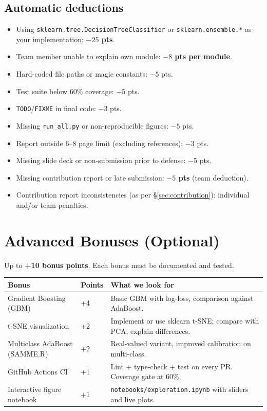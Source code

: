 \documentclass[11pt,a4paper]{article}
\newcommand{\warn}[1]{\textcolor{accent2}{\textbf{#1}}}
\begin{document}
\subsection{Automatic deductions}
\begin{itemize}[topsep=2pt,itemsep=1pt]
  \item Using \texttt{sklearn.tree.DecisionTreeClassifier} or \texttt{sklearn.ensemble.*} as your implementation: \warn{$-25$ pts}.
  \item Team member unable to explain own module: \warn{$-8$ pts per module}.
  \item Hard-coded file paths or magic constants: $-5$ pts.
  \item Test suite below 60\% coverage: $-5$ pts.
  \item \texttt{TODO}/\texttt{FIXME} in final code: $-3$ pts.
  \item Missing \texttt{run\_all.py} or non-reproducible figures: $-5$ pts.
  \item Report outside 6--8 page limit (excluding references): $-3$ pts.
  \item Missing slide deck or non-submission prior to defense: $-5$ pts.
  \item Missing contribution report or late submission: \warn{$-5$ pts} (team deduction).
  \item Contribution report inconsistencies (as per \S\ref{sec:contribution}): individual and/or team penalties.
\end{itemize}
\section{Advanced Bonuses (Optional)}\label{sec:bonuses}
Up to \textbf{+10 bonus points}. Each bonus must be documented and tested.
\begin{center}\small
\begin{tabular}{>{\raggedright\arraybackslash}p{5.2cm} >{\centering\arraybackslash}p{1.3cm} >{\raggedright\arraybackslash}p{8.8cm}}
\toprule
\textbf{Bonus} & \textbf{Points} & \textbf{What we look for}\\
\midrule
Gradient Boosting (GBM) & +4 & Basic GBM with log-loss, comparison against AdaBoost.\\
t-SNE visualization & +2 & Implement or use sklearn t-SNE; compare with PCA, explain differences.\\
Multiclass AdaBoost (SAMME.R) & +2 & Real-valued variant, improved calibration on multi-class.\\
GitHub Actions CI & +1 & Lint + type-check + test on every PR. Coverage gate at 60\%.\\
Interactive figure notebook & +1 & \texttt{notebooks/exploration.ipynb} with sliders and live plots.\\
\bottomrule
\end{tabular}
\end{center}
\end{document}
